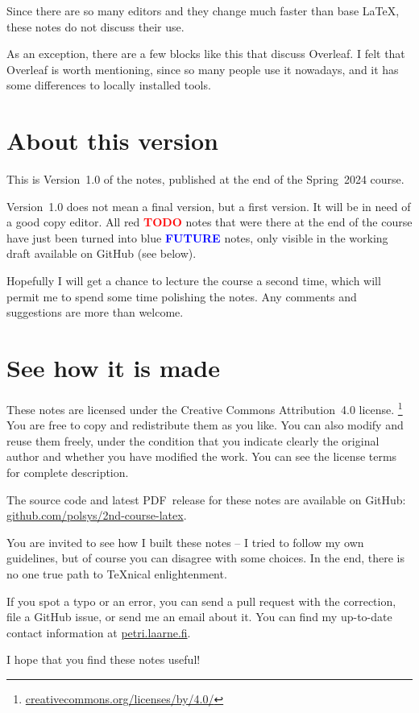 Since there are so many editors and they change much faster than base \LaTeX,
these notes do not discuss their use.

\begin{overleaf}
As an exception, there are a few blocks like this that discuss Overleaf.
I felt that Overleaf is worth mentioning, since so many people use it nowadays,
and it has some differences to locally installed tools.
\end{overleaf}


%
%
\section{About this version}

This is Version~1.0 of the notes, published at the end of the Spring~2024 course.

Version~1.0 does not mean a final version, but a first version.
It will be in need of a good copy editor.
All red \textcolor{red}{\textbf{TODO}} notes that were there at the end of the course
have just been turned into blue \textcolor{blue}{\textbf{FUTURE}} notes,
only visible in the working draft available on GitHub (see below).


Hopefully I will get a chance to lecture the course a second time,
which will permit me to spend some time polishing the notes.
Any comments and suggestions are more than welcome.



%
%
\section{See how it is made}

\noindent{\Huge\faCreativeCommons\faCreativeCommonsBy}
These notes are licensed under the Creative Commons Attribution~4.0 license.%
\footnote{\url{creativecommons.org/licenses/by/4.0/}}
You are free to copy and redistribute them as you like.
You can also modify and reuse them freely,
under the condition that you indicate clearly the original author
and whether you have modified the work.
You can see the license terms for complete description.

\bigskip\noindent{\huge\faGithub}
The source code and latest PDF~release for these notes are available on GitHub:
\url{github.com/polsys/2nd-course-latex}.

You are invited to see how I built these notes
-- I tried to follow my own guidelines, but of course you can disagree with some choices.
In the end, there is no one true path to \TeX nical enlightenment.

If you spot a typo or an error, you can send a pull request with the correction,
file a GitHub issue, or send me an email about it.
You can find my up-to-date contact information at \url{petri.laarne.fi}.

\bigskip\noindent
I hope that you find these notes useful!
